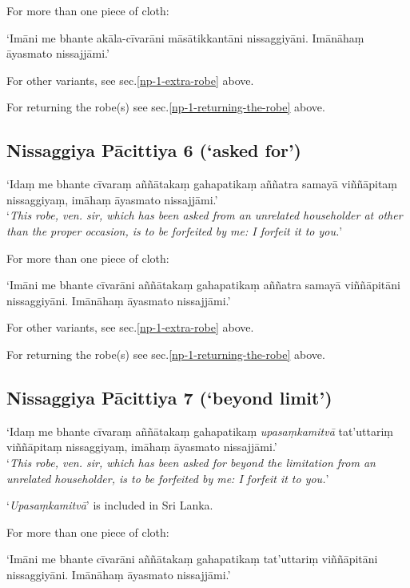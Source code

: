 
For more than one piece of cloth:

‘Imāni me bhante akāla-cīvarāni māsātikkantāni nissaggiyāni. Imānāhaṃ āyasmato nissajjāmi.’

For other variants, see sec.\ref{np-1-extra-robe} above.

For returning the robe(s) see sec.\ref{np-1-returning-the-robe} above.

\subsection{Nissaggiya Pācittiya 6 (‘asked for’)}

‘Idaṃ me bhante cīvaraṃ aññātakaṃ gahapatikaṃ aññatra samayā viññāpitaṃ
nissaggiyaṃ, imāhaṃ āyasmato nissajjāmi.’\\
‘\emph{This robe, ven. sir, which has been asked from an unrelated householder at
other than the proper occasion, is to be forfeited by me: I forfeit it to you.}’


For more than one piece of cloth:

‘Imāni me bhante cīvarāni aññātakaṃ
gahapatikaṃ aññatra samayā viññāpitāni
nissaggiyāni. Imānāhaṃ āyasmato nissajjāmi.’

For other variants, see sec.\ref{np-1-extra-robe} above.

For returning the robe(s) see sec.\ref{np-1-returning-the-robe} above.

\subsection{Nissaggiya Pācittiya 7 (‘beyond limit’)}

‘Idaṃ me bhante cīvaraṃ aññātakaṃ gahapatikaṃ \emph{upasaṃkamitvā} tat'uttariṃ
viññāpitaṃ nissaggiyaṃ, imāhaṃ āyasmato nissajjāmi.’\\
‘\emph{This robe, ven. sir, which has been asked for beyond the limitation from an
unrelated householder, is to be forfeited by me: I forfeit it to you.}’


‘\emph{Upasaṃkamitvā}’ is included in Sri Lanka.

For more than one piece of cloth:

‘Imāni me bhante cīvarāni aññātakaṃ gahapatikaṃ tat'uttariṃ viññāpitāni
nissaggiyāni. Imānāhaṃ āyasmato nissajjāmi.’

